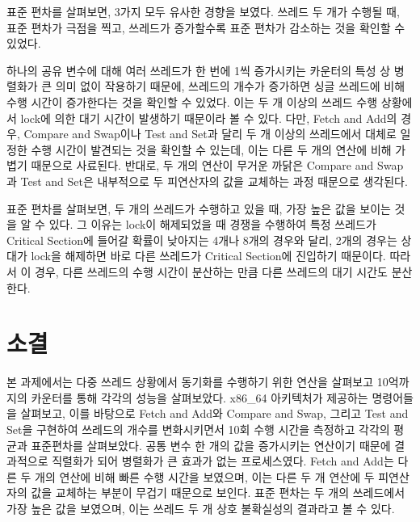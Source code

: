 \documentclass[11pt, a4paper]{article}
\begin{document}
표준 편차를 살펴보면, 3가지 모두 유사한 경향을 보였다. 쓰레드 두 개가 수행될 때, 표준 편차가 극점을 찍고, 쓰레드가 증가할수록 표준 편차가 감소하는 것을 확인할 수 있었다.

하나의 공유 변수에 대해 여러 쓰레드가 한 번에 1씩 증가시키는 카운터의 특성 상 병렬화가 큰 의미 없이 작용하기 때문에, 쓰레드의 개수가 증가하면 싱글 쓰레드에 비해 수행 시간이 증가한다는 것을 확인할 수 있었다. 이는 두 개 이상의 쓰레드 수행 상황에서 lock에 의한 대기 시간이 발생하기 때문이라 볼 수 있다. 다만, Fetch and Add의 경우, Compare and Swap이나 Test and Set과 달리 두 개 이상의 쓰레드에서 대체로 일정한 수행 시간이 발견되는 것을 확인할 수 있는데, 이는 다른 두 개의 연산에 비해 가볍기 때문으로 사료된다. 반대로, 두 개의 연산이 무거운 까닭은 Compare and Swap과 Test and Set은 내부적으로 두 피연산자의 값을 교체하는 과정 때문으로 생각된다.

표준 편차를 살펴보면, 두 개의 쓰레드가 수행하고 있을 때, 가장 높은 값을 보이는 것을 알 수 있다. 그 이유는 lock이 해제되었을 때 경쟁을 수행하여 특정 쓰레드가 Critical Section에 들어갈 확률이 낮아지는 4개나 8개의 경우와 달리, 2개의 경우는 상대가 lock을 해제하면 바로 다른 쓰레드가 Critical Section에 진입하기 때문이다. 따라서 이 경우, 다른 쓰레드의 수행 시간이 분산하는 만큼 다른 쓰레드의 대기 시간도 분산한다. 

\section{소결}

본 과제에서는 다중 쓰레드 상황에서 동기화를 수행하기 위한 연산을 살펴보고 10억까지의 카운터를 통해 각각의 성능을 살펴보았다. x86\_64 아키텍처가 제공하는 명령어들을 살펴보고, 이를 바탕으로 Fetch and Add와 Compare and Swap, 그리고 Test and Set을 구현하여 쓰레드의 개수를 변화시키면서 10회 수행 시간을 측정하고 각각의 평균과 표준편차를 살펴보았다. 공통 변수 한 개의 값을 증가시키는 연산이기 때문에 결과적으로 직렬화가 되어 병렬화가 큰 효과가 없는 프로세스였다. Fetch and Add는 다른 두 개의 연산에 비해 빠른 수행 시간을 보였으며, 이는 다른 두 개 연산에 두 피연산자의 값을 교체하는 부분이 무겁기 때문으로 보인다. 표준 편차는 두 개의 쓰레드에서 가장 높은 값을 보였으며, 이는 쓰레드 두 개 상호 불확실성의 결과라고 볼 수 있다.



\end{document}
